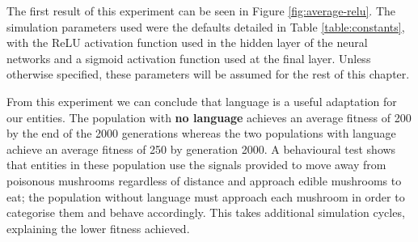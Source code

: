\documentclass[12pt,a4paper]{report}
\begin{document}
The first result of this experiment can be seen in Figure \ref{fig:average-relu}. The simulation parameters used were the defaults detailed in Table \ref{table:constants}, with the ReLU activation function used in the hidden layer of the neural networks and a sigmoid activation function used at the final layer. Unless otherwise specified, these parameters will be assumed for the rest of this chapter.

From this experiment we can conclude that language is a useful adaptation for our entities. The population with {\bf no language} achieves an average fitness of 200 by the end of the 2000 generations whereas the two populations with language achieve an average fitness of 250 by generation 2000. A behavioural test shows that entities in these population use the signals provided to move away from poisonous mushrooms regardless of distance and approach edible mushrooms to eat; the population without language must approach each mushroom in order to categorise them and behave accordingly. This takes additional simulation cycles, explaining the lower fitness achieved.
\end{document}
